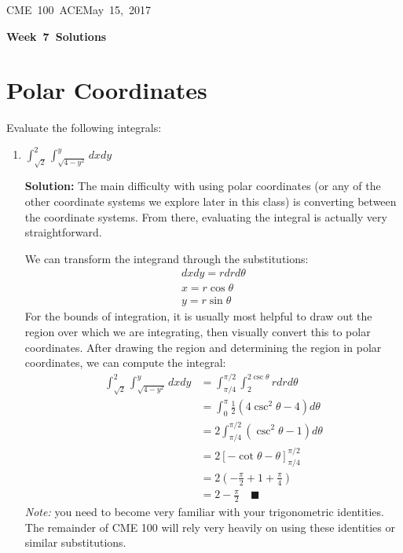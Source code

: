 \documentclass[letterpaper, 11pt]{article}
\makeatletter
\newcommand{\hmwkTitle}{Week\ 7\ Solutions} %
\newcommand{\hmwkClass}{CME\ 100\ ACE} %
\newcommand{\hmwkAuthorName}{Timothy Anderson} %
\newcommand{\hmwkAuthorEmail}{timmya@stanford.edu} %
\makeatother
\begin{document}
\noindent
\normalsize 
\hmwkClass \hfill May\ 15,\ 2017\\

\begin{center} \Large \textbf{\hmwkTitle} \end{center}

\section{Polar Coordinates}
Evaluate the following integrals:
\begin{enumerate}[label=(\alph*)]
\item $\int_{\sqrt{2}}^2 \int_{\sqrt{ 4- y^2}}^y dx dy$
\par \textbf{Solution:} The main difficulty with using polar coordinates (or any of the other coordinate systems we explore later in this class) is converting between the coordinate systems. From there, evaluating the integral is actually very straightforward. 
\par We can transform the integrand through the substitutions:
\begin{gather*}
dx dy = r dr d \theta \\
x = r \cos \theta\\
y = r \sin \theta
\end{gather*}
For the bounds of integration, it is usually most helpful to draw out the region over which we are integrating, then visually convert this to polar coordinates. After drawing the region and determining the region in polar coordinates, we can compute the integral:
\begin{align*}
\int_{\sqrt{2}}^2 \int_{\sqrt{ 4- y^2}}^y dx dy &= \int_{\pi/4}^{\pi/2} \int_{2}^{2 \csc \theta} r dr d\theta \\
&=  \int_0^\pi \frac{1}{2}\left( 4\csc^2 \theta - 4\right)d\theta \\
&= 2 \int_{\pi/4}^{\pi/2} ( \csc^2 \theta - 1)d\theta \\
&= 2\left[-\cot \theta - \theta   \right]_{\pi/4}^{\pi/2} \\
&= 2\left( - \frac{\pi}{2} + 1 + \frac{\pi}{4} \right)\\
&= 2 - \frac{\pi}{2} \quad\blacksquare 
\end{align*}
\textit{Note:} you need to become very familiar with your trigonometric identities. The remainder of CME 100 will rely very heavily on using these identities or similar substitutions. 


\end{enumerate}
\end{document}
